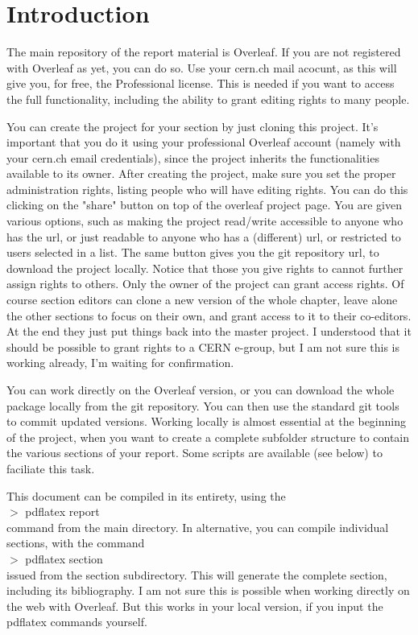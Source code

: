 \documentclass[../report.tex]{subfiles}
\begin{document}
\section{Introduction}
The main repository of the report material is Overleaf. If you are not
registered with Overleaf as yet, you can do so. Use your cern.ch mail
acocunt, as this will give you, for free, the Professional license. This
is needed if you want to access the full functionality, including the
ability to grant editing rights to many people.

You can create the project for your section by just cloning this
project. It's important that you do it using your professional
Overleaf account (namely with your cern.ch email credentials), since
the project inherits the functionalities available to its owner.
After creating the project, make sure you set the proper
administration rights, listing people who will have editing
rights. You can do this clicking on the "share" button on top of the overleaf project page. You are given various options, such as making the project read/write accessible to anyone who has the url, or just readable to anyone who has a (different) url, or restricted to users selected in a list. The same button gives you the git repository url, to download the project locally. Notice that those you give rights to cannot further assign
rights to others. Only the owner of the project can grant access
rights. Of course section editors can clone a new version of the whole
chapter, leave alone the other sections to focus on their own, and
grant access to it to their co-editors. At the end they just put
things back into the master project.  I understood that it should be
possible to grant rights to a CERN e-group, but I am not sure this is
working already, I'm waiting for confirmation.

You can work directly on the Overleaf version, or you can download the
whole package locally from the git repository. You can then use the
standard git tools to commit updated versions. Working locally is
almost essential at the beginning of the project, when you want to
create a complete subfolder structure to contain the various sections
of your report. Some scripts are available (see below) to faciliate
this task.

This document can be compiled in its entirety, using the\\
$>$ pdflatex report\\
command from the main directory. In alternative, you can compile
individual sections, with the command\\
$>$ pdflatex section\\
issued from the section subdirectory. This will generate the complete
section, including its 
bibliography.
I am not sure this is possible when working directly on the web with
Overleaf. But this works in your local version, if you input the
pdflatex commands yourself.
\end{document}
